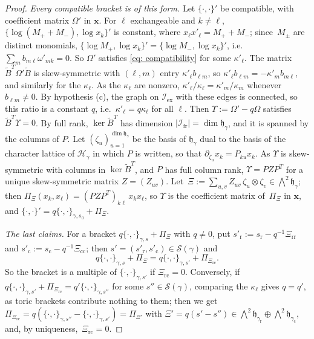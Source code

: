 \documentclass[a4paper]{amsart}
\numberwithin{equation}{section}
\theoremstyle{definition}
\theoremstyle{remark}
\newcommand{\mfh}{\mathfrak{h}}
\newcommand{\mcH}{\mathcal{H}}
\newcommand{\mcS}{\mathcal{S}}
\newcommand{\mcI}{\mathcal{I}}
\newcommand{\bx}{\mathbf{x}}
\newcommand{\tB}{\widetilde{B}}
\newcommand{\rr}{\mathrm{r}}
\newcommand{\cc}{\mathrm{c}}
\newcommand{\ex}{\mathrm{ex}}
\newcommand{\fr}{\mathrm{fr}}
\newcommand{\toric}{\Pi}
\begin{document}
\begin{proof}
  \emph{Every compatible bracket is of this form.} Let $\{\cdot,\cdot\}'$ be compatible, with coefficient matrix $\Omega'$ in $\bx$.
  For $\ell$ exchangeable and $k\neq\ell$, $\{\log(M_++M_-),\log x_k\}'$ is constant, where $x_\ell x'_\ell=M_++M_-$; since~$M_\pm$ are distinct monomials, $\{\log M_+,\log x_k\}'=\{\log M_-,\log x_k\}'$, i.e.\ $\sum_{m}b_{m\ell}\omega'_{mk}=0$.
  So $\Omega'$ satisfies \eqref{eq: compatibility} for some $\kappa'_\ell$.
  The matrix $\tB^T\Omega'\tB$ is skew-symmetric with $(\ell,m)$ entry $\kappa'_\ell b_{\ell m}$, so $\kappa'_\ell b_{\ell m}=-\kappa'_mb_{m\ell}$, and similarly for the $\kappa_\ell$.
  As the $\kappa_\ell$ are nonzero, $\kappa'_\ell/\kappa_\ell=\kappa'_m/\kappa_m$ whenever $b_{\ell m}\neq0$.
  By hypothesis (c), the graph on $\mcI_\ex$ with these edges is connected, so this ratio is a constant $q$, i.e.\ $\kappa'_\ell=q\kappa_\ell$ for all $\ell$.
  Then $\Upsilon:=\Omega'-q\Omega$ satisfies $\tB^T\Upsilon=0$.
  By full rank, $\ker\tB^T$ has dimension $|\mcI_\fr|=\dim\mfh_\gamma$, and it is spanned by the columns of $P$.
  Let $(\zeta_u)_{u=1}^{\dim\mfh_\gamma}$ be the basis of $\mfh_\gamma$ dual to the basis of the character lattice of $\mcH_\gamma$ in which $P$ is written, so that $\partial_{\zeta_u}x_k=P_{ku}x_k$.
  As $\Upsilon$ is skew-symmetric with columns in $\ker\tB^T$, and $P$ has full column rank, $\Upsilon=PZP^T$ for a unique skew-symmetric matrix $Z=(Z_{uv})$.
  Let~$\Xi:=\sum_{u,v}Z_{uv}\,\zeta_u\otimes\zeta_v\in\bigwedge^2\mfh_\gamma$; then $\toric_\Xi(x_k,x_\ell)=(PZP^T)_{k\ell}\,x_kx_\ell$, so $\Upsilon$ is the coefficient matrix of~$\toric_\Xi$ in $\bx$, and $\{\cdot,\cdot\}'=q\{\cdot,\cdot\}_{\gamma,s_0}+\toric_\Xi$.

  \emph{The last claims.} For a bracket $q\{\cdot,\cdot\}_{\gamma,s}+\toric_\Xi$ with $q\neq0$, put $s'_{\rr}:=s_{\rr}-q^{-1}\Xi_\mathrm{rr}$ and $s'_{\cc}:=s_{\cc}-q^{-1}\Xi_\mathrm{cc}$; then $s'=(s'_{\rr},s'_{\cc})\in\mcS(\gamma)$ and
  \[
    q\{\cdot,\cdot\}_{\gamma,s}+\toric_\Xi=q\{\cdot,\cdot\}_{\gamma,s'}+\toric_{\Xi_\mathrm{rc}}.
  \]
  So the bracket is a multiple of $\{\cdot,\cdot\}_{\gamma,s'}$ if $\Xi_\mathrm{rc}=0$.
  Conversely, if $q\{\cdot,\cdot\}_{\gamma,s'}+\toric_{\Xi_\mathrm{rc}}=q'\{\cdot,\cdot\}_{\gamma,s''}$ for some $s''\in\mcS(\gamma)$, comparing the $\kappa_\ell$ gives $q=q'$, as toric brackets contribute nothing to them; then we get~$\toric_{\Xi_\mathrm{rc}}=q(\{\cdot,\cdot\}_{\gamma,s''}-\{\cdot,\cdot\}_{\gamma,s'})=\toric_{\Xi'}$ with $\Xi'=q(s'-s'')\in\bigwedge^2\mfh_{\gamma_{\rr}}\oplus\bigwedge^2\mfh_{\gamma_{\cc}}$, and, by uniqueness,~$\Xi_\mathrm{rc}=0$.

\end{proof}
\end{document}
